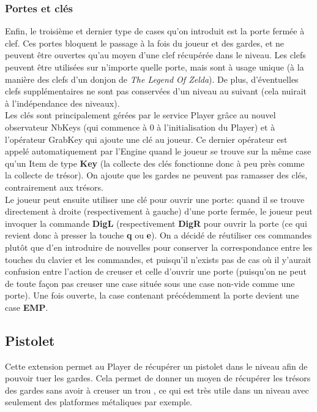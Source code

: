 \documentclass{article}
\begin{document}
\subsubsection{Portes et clés}
Enfin, le troisième et dernier type de cases qu'on introduit est la porte fermée à clef. Ces portes bloquent le passage à la fois du joueur et des gardes, et ne peuvent être ouvertes qu'au moyen d'une clef récupérée dans le niveau. Les clefs peuvent être utilisées sur n'importe quelle porte, mais sont à usage unique (à la manière des clefs d'un donjon de \textit{The Legend Of Zelda}). De plus, d'éventuelles clefs supplémentaires ne sont pas conservées d'un niveau au suivant (cela nuirait à l'indépendance des niveaux).\\

Les clés sont principalement gérées par le service \textrm{Player} grâce au nouvel observateur \textrm{NbKeys} (qui commence à 0 à l'initialisation du \textrm{Player}) et à l'opérateur \textrm{GrabKey} qui ajoute une clé au joueur. Ce dernier opérateur est appelé automatiquement par l'\textrm{Engine} quand le joueur se trouve sur la même case qu'un \textrm{Item} de type \textbf{Key} (la collecte des clés fonctionne donc à peu près comme la collecte de trésor). On ajoute que les gardes ne peuvent pas ramasser des clés, contrairement aux trésors.\\

Le joueur peut ensuite utiliser une clé pour ouvrir une porte: quand il se trouve directement à droite (respectivement à gauche) d'une porte fermée, le joueur peut invoquer la commande \textbf{DigL} (respectivement \textbf{DigR} pour ouvrir la porte (ce qui revient donc à presser la touche \textbf{q} ou \textbf{e}). On a décidé de réutiliser ces commandes plutôt que d'en introduire de nouvelles pour conserver la correspondance entre les touches du clavier et les commandes, et puisqu'il n'exists pas de cas où il y'aurait confusion entre l'action de creuser et celle d'ouvrir une porte (puisqu'on ne peut de toute façon pas creuser une case située sous une case non-vide comme une porte). Une fois ouverte, la case contenant précédemment la porte devient une case \textbf{EMP}.

\subsection{Pistolet}

Cette extension permet au Player de récupérer un pistolet dans le niveau afin de pouvoir tuer les gardes. Cela permet de donner un moyen de récupérer les trésors des gardes sans avoir à creuser un trou , ce qui est très utile dans un niveau avec seulement des platformes métaliques par exemple.\\
\end{document}
